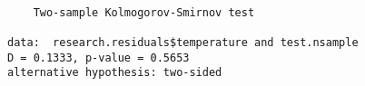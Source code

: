 \begin{verbatim} 

	Two-sample Kolmogorov-Smirnov test

data:  research.residuals$temperature and test.nsample
D = 0.1333, p-value = 0.5653
alternative hypothesis: two-sided

\end{verbatim}
